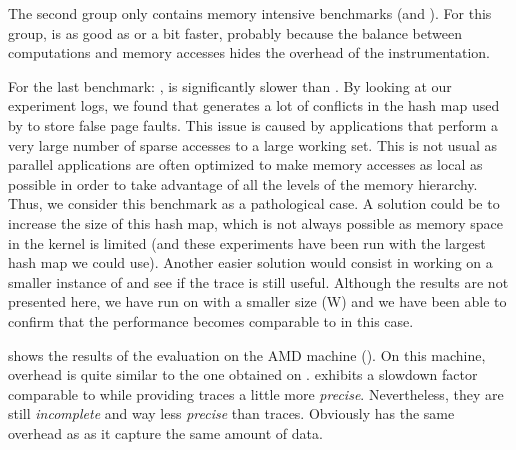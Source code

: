 The second group only contains memory intensive benchmarks (\FT and
\IS). For this group, \Moca is as good as \TABARNAC or a bit faster, probably
because the balance between computations and memory accesses hides the
overhead of the instrumentation.

For the last benchmark: \MG, \Moca is significantly slower than \TABARNAC.
By looking at our
experiment logs, we found that \MG generates a lot of conflicts in the hash map used by
\Moca to store false page faults. This issue is caused by applications that perform a very large number of sparse accesses to a large working set.
This is not usual as parallel applications are often optimized to make memory accesses as local as possible in order to take advantage of all the levels of the
memory hierarchy.
Thus, we consider this benchmark as a pathological case.
A solution could be to increase the size of
this hash map, which is not always possible as memory space in the kernel is
limited (and these experiments have been run with the largest hash map we could use). Another easier solution would consist in working on a smaller instance
of \MG and see if the trace is still useful. Although the results are not presented here, we have run \Moca on \MG with a smaller size (W) and we have been able
to confirm that the performance becomes comparable to \TABARNAC in this case.

 shows the results of the evaluation on the AMD machine
(\Stremi). On this machine, \Moca overhead is quite similar to the one
obtained on \Edel.
\MemProf exhibits a slowdown factor comparable to \Mitos while
providing traces a little more \emph{precise}. Nevertheless, they are still \emph{incomplete} and
way less \emph{precise} than \Moca traces. Obviously \MemProfTun has the same
overhead as \MemProf as it capture the same amount of data.

